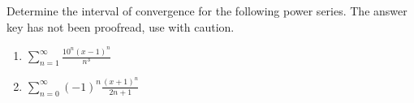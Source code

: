 Determine the interval of convergence for the following power series. The answer key has not been proofread, use with caution.
\begin{enumerate}
\item $\displaystyle \sum \limits_{n= 1}^{\infty} \frac{ 10^n(x-1)^n}{n^3}$
\item $\displaystyle \sum\limits_{n=0}^{\infty}(-1)^n \frac{(x+1)^n }{ 2n+1} $
\answer{$x\in (0, 2]$}
\end{enumerate}